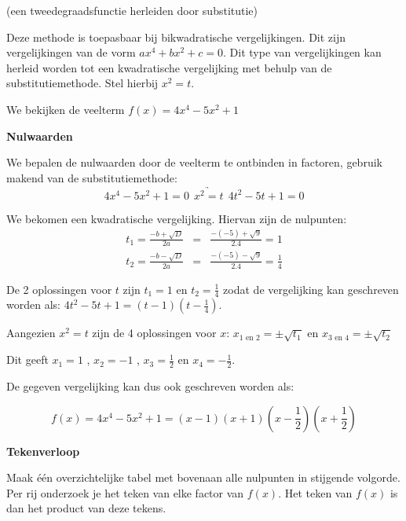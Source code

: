 \begin{voorbeeld}
	 (een tweedegraadsfunctie herleiden door substitutie)

Deze methode is toepasbaar bij bikwadratische vergelijkingen. Dit
zijn vergelijkingen van de vorm $ax^{4}+bx^{2}+c=0$. Dit type van
vergelijkingen kan herleid worden tot een kwadratische vergelijking
met behulp van de substitutiemethode. Stel hierbij $x^{2}=t$.

We bekijken de veelterm $f(x)=4x^{4}-5x^{2}+1$

\textbf{Nulwaarden}

 We bepalen de nulwaarden door de veelterm te ontbinden in
factoren, gebruik makend van de substitutiemethode:\\

\begin{equation*}
4x^{4}-5x^{2}+1=0 \ \   \underrightarrow{x^{2}=t}  \ \ 4t^{2}-5t+1=0
\end{equation*}

 We bekomen een kwadratische vergelijking. Hiervan zijn de
nulpunten:
\begin{eqnarray*}
t_{1}=\frac{-b+\sqrt{D}}{2a}&=&\frac{-(-5)+\sqrt{9}}{2.4}=1 \\
t_{2}=\frac{-b-\sqrt{D}}{2a}&=&\frac{-(-5)-\sqrt{9}}{2.4}=\frac{1}{4}
\end{eqnarray*}

De 2 oplossingen voor $t$ zijn $t_{1}=1$ en $t_{2}=\frac{1}{4}$
zodat de vergelijking kan geschreven worden als: $4t^{2}-5t+1=(t-1)(t-\frac{1}{4})$.

Aangezien $x^{2}=t$ zijn de 4 oplossingen voor $x$: $x_{1 \text{ en }2}=\pm\sqrt{t_{1}}$
en $x_{3 \text{ en } 4}=\pm\sqrt{t_{2}}$ 

Dit geeft $x_{1}=1$ , $x_{2}=-1$ , $x_{3}=\frac{1}{2}$
en $x_{4}=-\frac{1}{2}$.

De gegeven vergelijking kan dus ook geschreven worden als:

\begin{equation*}
f(x)=4x^{4}-5x^{2}+1=(x-1)(x+1)(x-\frac{1}{2})(x+\frac{1}{2})
\end{equation*}

\textbf{Tekenverloop}

Maak \'e\'en overzichtelijke tabel met bovenaan alle nulpunten
in stijgende volgorde. Per rij onderzoek je het teken van elke factor
van $f(x)$. Het teken van $f(x)$ is dan het product van deze tekens.


\end{voorbeeld}
